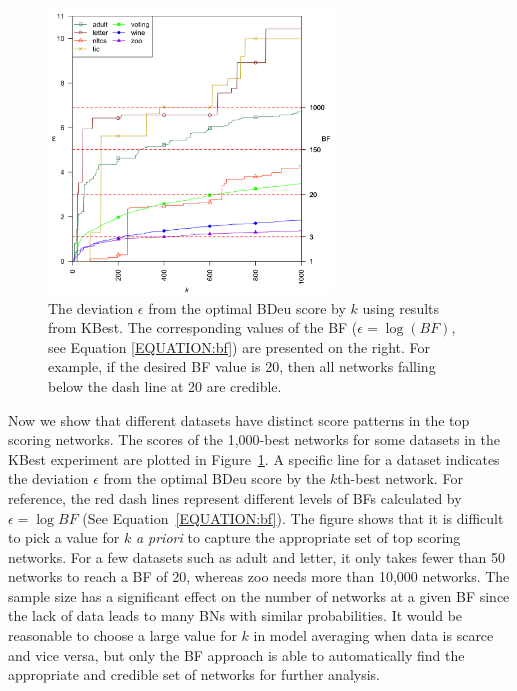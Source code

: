 \documentclass[letterpaper]{article}
\begin{document}
\vspace{-0.96mm}
\vspace{-1.48mm}
\begin{figure}[thb]
\centering
\includegraphics[width=\linewidth,height=2.979in ]{plot_diff.png}
\caption{The deviation $\epsilon$ from the optimal BDeu score by $k$ using results from KBest. The corresponding values of the BF ($\epsilon=\log(BF)$, see Equation \ref{EQUATION:bf}) are presented on the right. For example, if the desired BF value is 20, then all networks falling below the dash line at 20 are credible.}\label{fig:diff}
\end{figure}

\vspace{-0.87mm}
\vspace{-1.50mm}
Now we show that different datasets have distinct score patterns in the top scoring networks. The scores of the 1,000-best networks for some datasets in the KBest experiment are plotted in Figure~\ref{fig:diff}. A specific line for a dataset indicates the deviation $\epsilon$ from the optimal BDeu score by the $k$th-best network. For reference, the red dash lines represent different levels of BFs calculated by $\epsilon=\log{BF}$ (See Equation~\ref{EQUATION:bf}). The figure shows that it is difficult to pick a value for $k$ \emph{a priori} to capture the appropriate set of top scoring networks. For a few datasets such as adult and letter, it only takes fewer than 50 networks to reach a BF of 20, whereas zoo needs more than 10,000 networks. The sample size has a significant effect on the number of networks at a given BF since the lack of data leads to many BNs with similar probabilities. It would be reasonable to choose a large value for $k$ in model averaging when data is scarce and vice versa, but only the BF approach is able to automatically find the appropriate and credible set of networks for further analysis.
\end{document}
